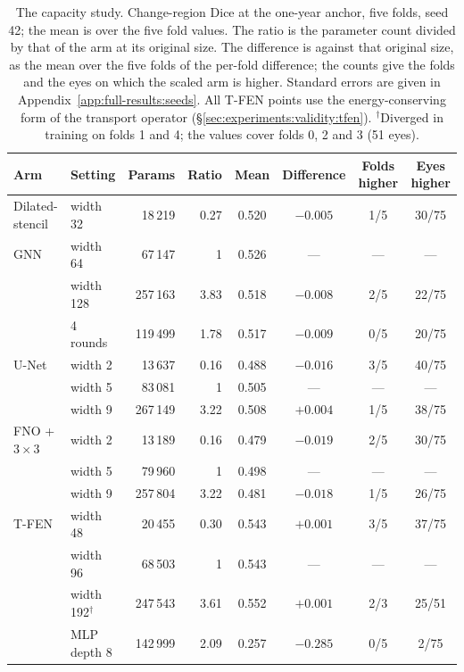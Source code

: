 \begin{table}[t]
  \centering
  \caption[The capacity study.]{%
    The capacity study. Change-region Dice at the one-year anchor, five
    folds, seed 42; the mean is over the five fold values. The ratio is the
    parameter count divided by that of the arm at its original size. The difference
    is against that original size, as the mean over the five folds of the
    per-fold difference; the counts give the folds and the eyes on which
    the scaled arm is higher. Standard errors are given in
    Appendix~\ref{app:full-results:seeds}. All T-FEN points use the
    energy-conserving form of the transport operator
    (\S\ref{sec:experiments:validity:tfen}). $^\dagger$Diverged in training on
    folds 1 and 4; the values cover folds 0, 2 and 3 (51 eyes).}
  \label{tab:experiments:capacity}
  \footnotesize
  \setlength{\tabcolsep}{3.7pt}
  \begin{tabular}{l l r r c c c c}
    \toprule
    Arm & Setting & Params & Ratio & Mean & Difference & Folds higher
      & Eyes higher \\
    \midrule
    Dilated-stencil & width 32 & 18\,219 & 0.27 & 0.520 & $-0.005$ & 1/5 & 30/75 \\
    GNN & width 64 & 67\,147 & 1 & 0.526 & --- & --- & --- \\
     & width 128 & 257\,163 & 3.83 & 0.518 & $-0.008$ & 2/5 & 22/75 \\
     & 4 rounds & 119\,499 & 1.78 & 0.517 & $-0.009$ & 0/5 & 20/75 \\
    \midrule
    U-Net & width 2 & 13\,637 & 0.16 & 0.488 & $-0.016$ & 3/5 & 40/75 \\
     & width 5 & 83\,081 & 1 & 0.505 & --- & --- & --- \\
     & width 9 & 267\,149 & 3.22 & 0.508 & $+0.004$ & 1/5 & 38/75 \\
    \midrule
    FNO + $3{\times}3$ & width 2 & 13\,189 & 0.16 & 0.479 & $-0.019$ & 2/5 & 30/75 \\
     & width 5 & 79\,960 & 1 & 0.498 & --- & --- & --- \\
     & width 9 & 257\,804 & 3.22 & 0.481 & $-0.018$ & 1/5 & 26/75 \\
    \midrule
    T-FEN & width 48 & 20\,455 & 0.30 & 0.543 & $+0.001$ & 3/5 & 37/75 \\
     & width 96 & 68\,503 & 1 & 0.543 & --- & --- & --- \\
     & width 192$^\dagger$ & 247\,543 & 3.61 & 0.552 & $+0.001$ & 2/3 & 25/51 \\
     & MLP depth 8 & 142\,999 & 2.09 & 0.257 & $-0.285$ & 0/5 & 2/75 \\
    \bottomrule
  \end{tabular}
\end{table}
